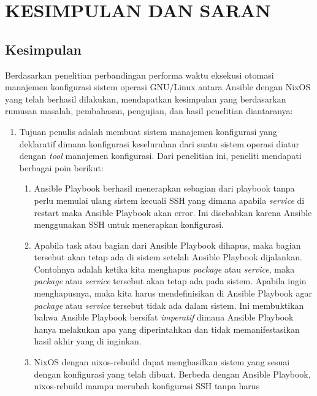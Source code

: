 \documentclass[10pt,]{report}
\begin{document}
\chapter{KESIMPULAN DAN SARAN}
\section{Kesimpulan}
\begin{adjustwidth}{20pt}{}
  \hspace\parindent 
  Berdasarkan penelitian perbandingan performa waktu eksekusi otomasi manajemen 
  konfigurasi sistem operasi GNU/Linux antara Ansible dengan NixOS yang telah 
  berhasil dilakukan, mendapatkan kesimpulan yang berdasarkan rumusan masalah,
  pembahasan, pengujian, dan hasil penelitian diantaranya:
  \begin{enumerate}[label=\arabic*.]
    \item Tujuan penulis adalah membuat sistem manajemen konfigurasi yang 
      deklaratif dimana konfigurasi keseluruhan dari suatu sistem operasi diatur
      dengan \textit{tool} manajemen konfigurasi. Dari penelitian ini, peneliti
      mendapati berbagai poin berikut:
      \begin{enumerate}[label=\alph*.]
      \item Ansible Playbook berhasil menerapkan sebagian dari playbook tanpa 
        perlu memulai ulang sistem kecuali SSH yang dimana apabila \textit{service}
          di restart maka Ansible Playbook akan error. Ini disebabkan karena 
          Ansible menggunakan SSH untuk menerapkan konfigurasi.
        \item Apabila task atau bagian dari Ansible Playbook dihapus, maka 
          bagian tersebut akan tetap ada di sistem setelah Ansible Playbook 
          dijalankan. Contohnya adalah ketika kita menghapus \textit{package}
          atau \textit{service}, maka \textit{package} atau \textit{service}
          tersebut akan tetap ada pada sistem. Apabila ingin menghapusnya, maka
          kita harus mendefinisikan di Ansible Playbook agar \textit{package} 
          atau \textit{service} tersebut tidak ada dalam sistem. Ini membuktikan
          bahwa Ansible Playbook bersifat \textit{imperatif} dimana Ansible 
          Playbook hanya melakukan apa yang diperintahkan dan tidak memanifestasikan
          hasil akhir yang di inginkan.
        \item NixOS dengan nixos-rebuild dapat menghasilkan sistem yang 
          sesuai dengan konfigurasi yang telah dibuat. Berbeda dengan Ansible 
          Playbook, nixos-rebuild mampu merubah konfigurasi SSH tanpa harus 

\end{enumerate}
\end{enumerate}
\end{adjustwidth}
\end{document}
